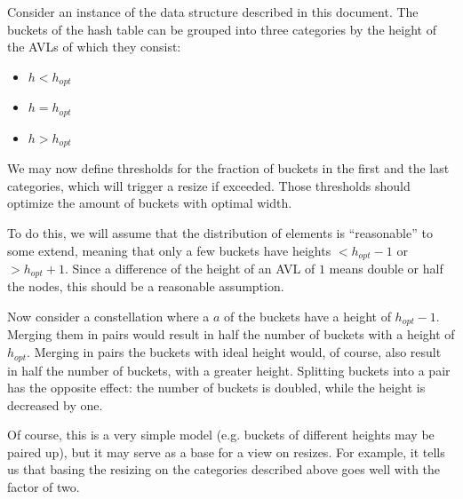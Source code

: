         Consider an instance of the data structure described in this document.
        The buckets of the hash table can be grouped into three categories by
        the height of the AVLs of which they consist:

        \begin{itemize}
            \item $h<h_{opt}$
            \item $h=h_{opt}$
            \item $h>h_{opt}$
        \end{itemize}

        We may now define thresholds for the fraction of buckets in the first
        and the last categories, which will trigger a resize if exceeded.
        Those thresholds should optimize the amount of buckets with optimal
        width.

        To do this, we will assume that the distribution of elements is
        ``reasonable'' to some extend, meaning that only a few buckets have
        heights $<h_{opt}-1$ or $>h_{opt}+1$.
        Since a difference of the height of an AVL of $1$ means double or half
        the nodes, this should be a reasonable assumption.

        Now consider a constellation where a $a$ of the buckets have a height
        of $h_{opt}-1$.
        Merging them in pairs would result in half the number of buckets with a
        height of $h_{opt}$.
        Merging in pairs the buckets with ideal height would, of course, also
        result in half the number of buckets, with a greater height.
        Splitting buckets into a pair has the opposite effect:
        the number of buckets is doubled, while the height is decreased by one.

        Of course, this is a very simple model (e.g. buckets of different
        heights may be paired up), but it may serve as a base for a view on
        resizes.
        For example, it tells us that basing the resizing on the categories
        described above goes well with the factor of two.

